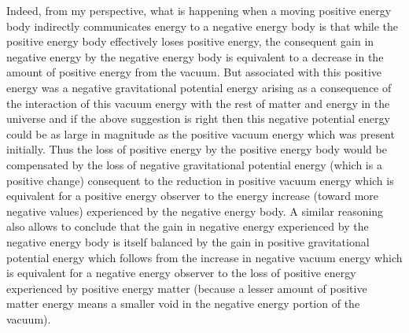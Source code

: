 \documentclass[notitlepage,12pt]{report}
\begin{document}
Indeed, from my perspective, what is happening when a moving positive energy body indirectly communicates energy to a negative energy body is that while the positive energy body effectively loses positive energy, the consequent gain in negative energy by the negative energy body is equivalent to a decrease in the amount of positive energy from the vacuum. But associated with this positive energy was a negative gravitational potential energy arising as a consequence of the interaction of this vacuum energy with the rest of matter and energy in the universe and if the above suggestion is right then this negative potential energy could be as large in magnitude as the positive vacuum energy which was present initially. Thus the loss of positive energy by the positive energy body would be compensated by the loss of negative gravitational potential energy (which is a positive change) consequent to the reduction in positive vacuum energy which is equivalent for a positive energy observer to the energy increase (toward more negative values) experienced by the negative energy body. A similar reasoning also allows to conclude that the gain in negative energy experienced by the negative energy body is itself balanced by the gain in positive gravitational potential energy which follows from the increase in negative vacuum energy which is equivalent for a negative energy observer to the loss of positive energy experienced by positive energy matter (because a lesser amount of positive matter energy means a smaller void in the negative energy portion of the vacuum).
\end{document}
